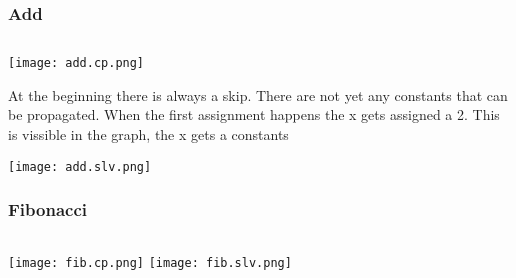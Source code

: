 \documentclass{article}
\begin{document}
\subsubsection*{Add}

\inputminted{c}{../examples/add.c}

\texttt{[image: add.cp.png]}

At the beginning there is always a skip.
There are not yet any constants that can be propagated.
When the first assignment happens the x gets assigned a 2.
This is vissible in the graph, the x gets a constants


\texttt{[image: add.slv.png]}


\subsubsection*{Fibonacci}

\inputminted{c}{../examples/fib.c}

\texttt{[image: fib.cp.png]}
\texttt{[image: fib.slv.png]}
\end{document}
